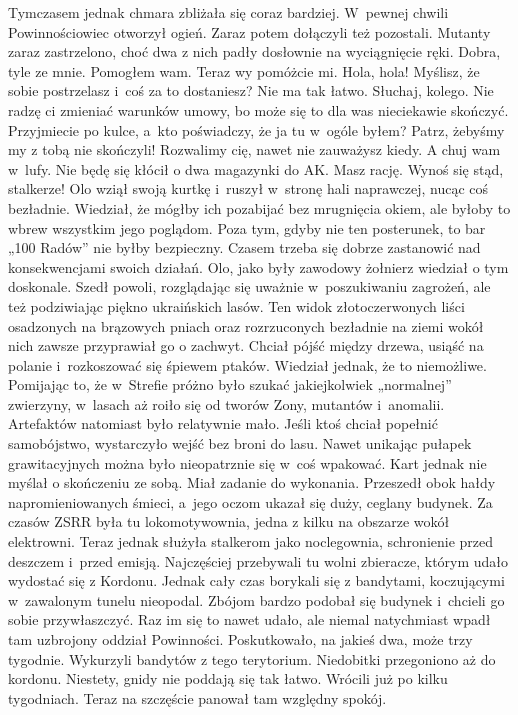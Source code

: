 \documentclass[../MAIN.tex]{subfiles}
\begin{document}
\mm Tymczasem jednak chmara zbliżała się coraz bardziej. W~pewnej chwili Powinnościowiec otworzył ogień. Zaraz potem dołączyli też pozostali. Mutanty zaraz zastrzelono, choć dwa z nich padły dosłownie na wyciągnięcie ręki.
\sx Dobra, tyle ze mnie. Pomogłem wam. Teraz wy pomóżcie mi.
\xx Hola, hola! Myślisz, że sobie postrzelasz i~coś za to dostaniesz? Nie ma tak łatwo.
\xx Słuchaj, kolego. Nie radzę ci zmieniać warunków umowy, bo może się to dla was nieciekawie skończyć. Przyjmiecie po kulce, a~kto poświadczy, że ja tu w~ogóle byłem?
\xx Patrz, żebyśmy my z tobą nie skończyli! Rozwalimy cię, nawet nie zauważysz kiedy.
\xx A chuj wam w~lufy. Nie będę się kłócił o dwa magazynki do AK.
\xx Masz rację. Wynoś się stąd, stalkerze!
\qd
\hspace{18.4em}Olo wziął swoją kurtkę i~ruszył w~stronę hali naprawczej, nucąc coś bezładnie. Wiedział, że mógłby ich pozabijać bez mrugnięcia okiem, ale byłoby to wbrew wszystkim jego poglądom. Poza tym, gdyby nie ten posterunek, to bar „100 Radów” nie byłby bezpieczny. Czasem trzeba się dobrze zastanowić nad konsekwencjami swoich działań. Olo, jako były zawodowy żołnierz wiedział o tym doskonale.
\pp
Szedł powoli, rozglądając się uważnie w~poszukiwaniu zagrożeń, ale też podziwiając piękno ukraińskich lasów. Ten widok złotoczerwonych liści osadzonych na brązowych pniach oraz rozrzuconych bezładnie na ziemi wokół nich zawsze przyprawiał go o zachwyt. Chciał pójść między drzewa, usiąść na polanie i~rozkoszować się śpiewem ptaków. Wiedział jednak, że to niemożliwe. Pomijając to, że w~Strefie próżno było szukać jakiejkolwiek „normalnej” zwierzyny, w~lasach aż roiło się od tworów Zony, mutantów i~anomalii. Artefaktów natomiast było relatywnie mało. Jeśli ktoś chciał popełnić samobójstwo, wystarczyło wejść bez broni do lasu. Nawet unikając pułapek grawitacyjnych można było nieopatrznie się w~coś wpakować.
\pp
Kart jednak nie myślał o skończeniu ze sobą. Miał zadanie do wykonania. Przeszedł obok hałdy napromieniowanych śmieci, a~jego oczom ukazał się duży, ceglany budynek. Za czasów ZSRR była tu lokomotywownia, jedna z kilku na obszarze wokół elektrowni. Teraz jednak służyła stalkerom jako noclegownia, schronienie przed deszczem i~przed emisją. Najczęściej przebywali tu wolni zbieracze, którym udało wydostać się z Kordonu. Jednak cały czas borykali się z bandytami, koczującymi w~zawalonym tunelu nieopodal. Zbójom bardzo podobał się budynek i~chcieli go sobie przywłaszczyć. Raz im się to nawet udało, ale niemal natychmiast wpadł tam uzbrojony oddział Powinności. Poskutkowało, na jakieś dwa, może trzy tygodnie. Wykurzyli bandytów z tego terytorium. Niedobitki przegoniono aż do kordonu. Niestety, gnidy nie poddają się tak łatwo. Wrócili już po kilku tygodniach. Teraz na szczęście panował tam względny spokój.
\end{document}
